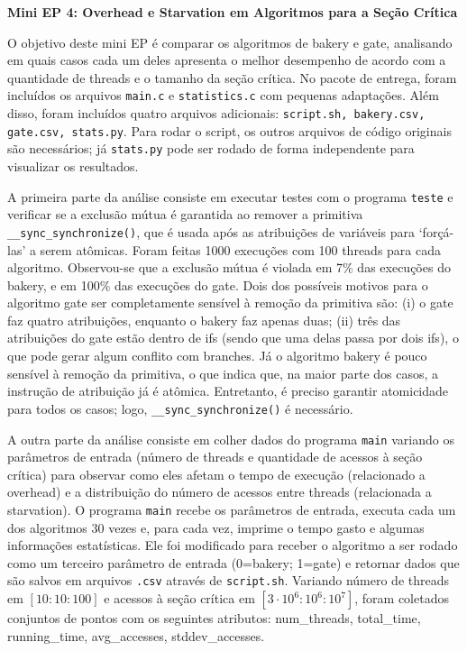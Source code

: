\documentclass[10pt,twocolumn]{article}
\begin{document}
\textbf{\large Mini EP 4: Overhead ​e ​Starvation ​em Algoritmos para a Seção Crítica}
\vspace{1em}

O objetivo deste mini EP é comparar os algoritmos de bakery e gate, analisando em quais casos cada um deles apresenta o melhor desempenho de acordo com a quantidade de threads e o tamanho da seção crítica. No pacote de entrega, foram incluídos os arquivos \texttt{main.c} e \texttt{statistics.c} com pequenas adaptações. Além disso, foram incluídos quatro arquivos adicionais: \texttt{script.sh, bakery.csv, gate.csv, stats.py}. Para rodar o script, os outros arquivos de código originais são necessários; já \texttt{stats.py} pode ser rodado de forma independente para visualizar os resultados.

A primeira parte da análise consiste em executar testes com o programa \texttt{teste} e verificar se a exclusão mútua é garantida ao remover a primitiva \texttt{__sync_synchronize()}, que é usada após as atribuições de variáveis para ‘forçá-las’ a serem atômicas. Foram feitas 1000 execuções com 100 threads para cada algoritmo. Observou-se que a exclusão mútua é violada em 7\% das execuções do bakery, e em 100\% das execuções do gate. Dois dos possíveis motivos para o algoritmo gate ser completamente sensível à remoção da primitiva são: (i) o gate faz quatro atribuições, enquanto o bakery faz apenas duas; (ii) três das atribuições do gate estão dentro de ifs (sendo que uma delas passa por dois ifs), o que pode gerar algum conflito com branches. Já o algoritmo bakery é pouco sensível à remoção da primitiva, o que indica que, na maior parte dos casos, a instrução de atribuição já é atômica. Entretanto, é preciso garantir atomicidade para todos os casos; logo, \texttt{__sync_synchronize()} é necessário.

A outra parte da análise consiste em colher dados do programa \texttt{main} variando os parâmetros de entrada (número de threads e quantidade de acessos à seção crítica) para observar como eles afetam o tempo de execução (relacionado a overhead) e a distribuição do número de acessos entre threads (relacionada a starvation). O programa \texttt{main} recebe os parâmetros de entrada, executa cada um dos algoritmos 30 vezes e, para cada vez, imprime o tempo gasto e algumas informações estatísticas. Ele foi modificado para receber o algoritmo a ser rodado como um terceiro parâmetro de entrada (0=bakery; 1=gate) e retornar dados que são salvos em arquivos \texttt{.csv} através de \texttt{script.sh}. Variando número de threads em $[10:10:100]$ e acessos à seção crítica em $[3 \cdot 10^6:10^6:10^7]$, foram coletados conjuntos de pontos com os seguintes atributos: num_threads, total_time, running_time, avg_accesses, stddev_accesses.
\end{document}
